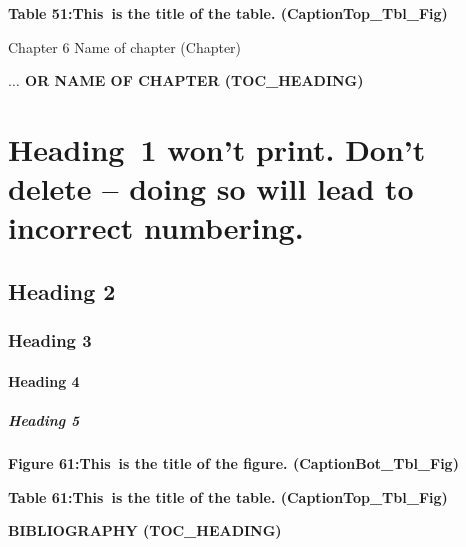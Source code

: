 \documentclass[12pt]{report}
\begin{document}
\begin{FlushLeft}
\textbf{Table 51:\tab This\ is the title of the table.  (CaptionTop\_Tbl\_Fig)}
\end{FlushLeft}\par




\newpage

\vspace{\baselineskip}Chapter 6  Name of chapter (Chapter)\par

\begin{FlushLeft}
{\fontsize{14pt}{16.8pt}\selectfont \textbf{\uppercase{$ \ldots $ or Name of Chapter (TOC\_HEADING)}}\par}
\end{FlushLeft}\par

\section*{Heading\ 1 won’t print.  Don’t delete – doing so will lead to incorrect numbering.}
\subsection*{Heading 2}
\subsubsection*{Heading 3}
\paragraph*{Heading 4}
\subparagraph*{Heading 5}
\begin{FlushLeft}
\textbf{Figure 61:\tab This\ is the title of the figure.  (CaptionBot\_Tbl\_Fig)}
\end{FlushLeft}\par

\begin{FlushLeft}
\textbf{Table 61:\tab This\ is the title of the table.  (CaptionTop\_Tbl\_Fig)}
\end{FlushLeft}\par




\newpage

\vspace{\baselineskip}\begin{FlushLeft}
{\fontsize{14pt}{16.8pt}\selectfont \textbf{\uppercase{Bibliography (TOC\_Heading)}}\par}
\end{FlushLeft}\par
\end{document}
